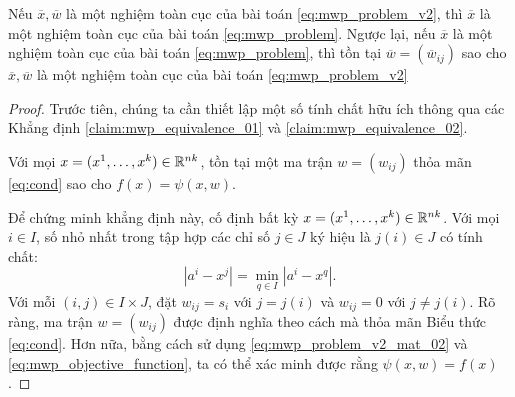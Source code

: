 \documentclass[a4paper]{report}
\begin{document}
    \begin{proposition}
        \label{prop:mwp_equivalence}
        Nếu $\overline{x}, \overline{w}$ là một nghiệm toàn cục của bài toán \eqref{eq:mwp_problem_v2}, thì $\overline{x}$ là một nghiệm toàn cục của bài toán \eqref{eq:mwp_problem}. Ngược lại, nếu $\overline{x}$ là một nghiệm toàn cục của bài toán \eqref{eq:mwp_problem}, thì tồn tại $\overline{w} = (\overline{w}_{ij})$ sao cho $\overline{x}, \overline{w}$ là một nghiệm toàn cục của bài toán \eqref{eq:mwp_problem_v2}
    \end{proposition}
    \begin{proof}
        Trước tiên, chúng ta cần thiết lập một số tính chất hữu ích thông qua các Khẳng định \ref{claim:mwp_equivalence_01} và \ref{claim:mwp_equivalence_02}.
        \begin{claim}
            \label{claim:mwp_equivalence_01}
            Với mọi $x = (x^1, \dots, x^k) \in \mathbb{R}^{nk}$, tồn tại một ma trận $w = (w_{ij})$ thỏa mãn \eqref{eq:cond} sao cho $f(x) =  \psi(x, w)$.
        \end{claim}
        Để chứng minh khẳng định này, cố định bất kỳ $x = (x^1, \dots, x^k) \in \mathbb{R}^{nk}$. Với mọi $i \in I$, số nhỏ nhất trong tập hợp các chỉ số $j \in J$ ký hiệu là $j(i) \in J$ có tính chất:
        \begin{equation}
            \left|a^i - x^j\right| = \min_{q \in I}\left|a^i - x^q\right|.
        \end{equation}
        Với mỗi $(i, j) \in I \times J$, đặt $w_{ij} = s_i$ với $j = j(i)$ và $w_{ij} = 0$ với $j \ne j(i)$. Rõ ràng, ma trận $w = (w_{ij})$ được định nghĩa theo cách mà thỏa mãn Biểu thức \eqref{eq:cond}. Hơn nữa, bằng cách sử dụng \eqref{eq:mwp_problem_v2_mat_02} và \eqref{eq:mwp_objective_function}, ta có thể xác minh được rằng $\psi(x, w) = f(x)$.


\end{proof}
\end{document}
